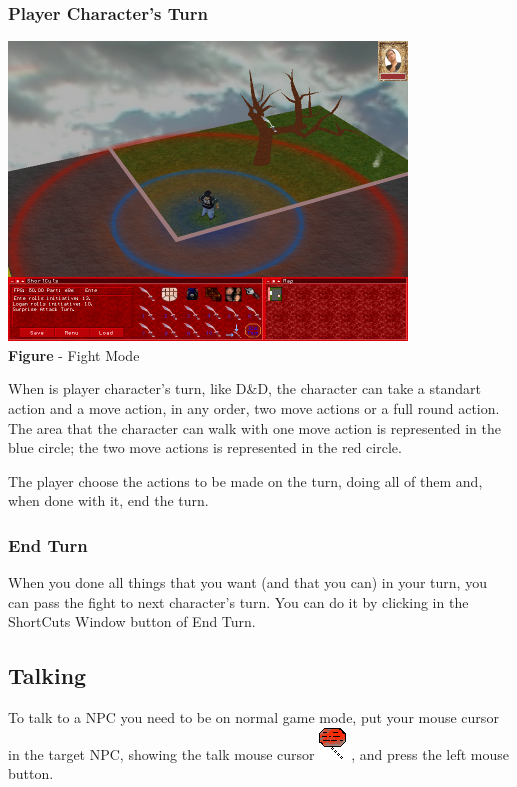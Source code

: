 \documentclass[ letterpaper,12pt]{article}
\begin{document}
\subsubsection{Player Character's Turn}

\begin{center}
  \includegraphics{fightMode.png}
\\{\bf Figure} - Fight Mode
\end{center}

When is player character's turn, like D\&D, the character can take a standart action and a move action, in any order, two move actions or a full round action. The area that the character can walk with one move action is represented in the blue circle; the two move actions is represented in the red circle.

The player choose the actions to be made on the turn, doing all of them and, when done with it, end the turn.

\subsubsection{End Turn}

When you done all things that you want (and that you can) in your turn, you can pass the fight to next character's turn. You can do it by clicking in the ShortCuts Window button of End Turn.

\subsection{Talking}

To talk to a NPC you need to be on normal game mode, put your mouse cursor in
the target NPC, showing the talk mouse cursor \includegraphics{talk.png},
and press the left mouse button.
\end{document}
